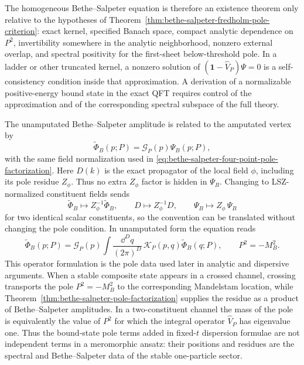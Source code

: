 \begin{remark}
The homogeneous Bethe--Salpeter equation is therefore an existence theorem
only relative to the hypotheses of
Theorem~\ref{thm:bethe-salpeter-fredholm-pole-criterion}: exact kernel,
specified Banach space, compact analytic dependence on \(P^2\), invertibility
somewhere in the analytic neighborhood, nonzero external overlap, and
spectral positivity for the first-sheet below-threshold pole.  In a ladder or
other truncated kernel, a nonzero solution of
\((\mathbf 1-\widehat V_P)\Psi=0\) is a self-consistency condition inside that
approximation.  A derivation of a normalizable positive-energy bound state in
the exact QFT requires control of the approximation and of the corresponding
spectral subspace of the full theory.
\end{remark}

The unamputated Bethe--Salpeter amplitude is related to the amputated vertex by
\[
  \widetilde\Phi_B(p;P)
  =
  \mathcal G_P(p)\Psi_B(p;P),
\]
with the same field normalization used in
\eqref{eq:bethe-salpeter-four-point-pole-factorization}.  Here \(D(k)\) is the
exact propagator of the local field \(\phi\), including its pole residue
\(Z_\phi\).  Thus no extra \(Z_\phi\) factor is hidden in
\(\Psi_B\).  Changing to LSZ-normalized constituent fields sends
\[
  \widetilde\Phi_B\mapsto Z_\phi^{-1}\widetilde\Phi_B,
  \qquad
  D\mapsto Z_\phi^{-1}D,
  \qquad
  \Psi_B\mapsto Z_\phi\,\Psi_B
\]
for two identical scalar constituents, so the convention can be translated
without changing the pole condition.
In unamputated form the equation reads
\[
  \widetilde\Phi_B(p;P)
  =
  \mathcal G_P(p)
  \int\frac{\dd^D q}{(2\pi)^D}\,
  \mathcal K_P(p,q)\widetilde\Phi_B(q;P),
  \qquad
  P^2=-M_B^2 .
\]
This operator formulation is the pole data used later in analytic and
dispersive arguments.  When a stable composite state appears in a crossed
channel, crossing transports the pole \(P^2=-M_B^2\) to the corresponding
Mandelstam location, while
Theorem~\ref{thm:bethe-salpeter-pole-factorization} supplies the residue as a
product of Bethe--Salpeter amplitudes.  In a two-constituent channel the mass
of the pole is equivalently the value of \(P^2\) for which the integral operator
\(\widehat V_P\) has eigenvalue one.  Thus the bound-state pole terms added in
fixed-\(t\) dispersion formulae are not independent terms in a meromorphic ansatz:
their positions and residues are the spectral and Bethe--Salpeter data of the
stable one-particle sector.


